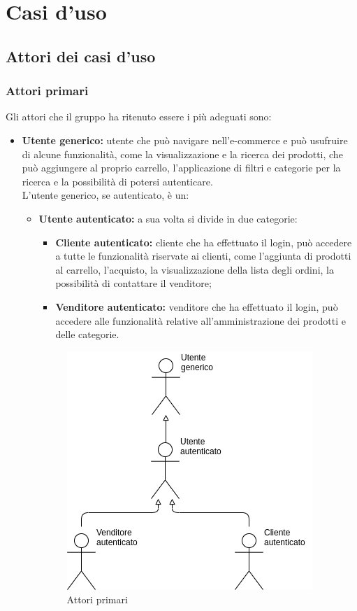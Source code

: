 \section{Casi d'uso}
\subsection{Attori dei casi d'uso}
\subsubsection{Attori primari}
Gli attori che il gruppo ha ritenuto essere i più adeguati sono:
\begin{itemize}
    \item \textbf{Utente generico:} utente che può navigare nell'e-commerce e può usufruire di alcune funzionalità, come la visualizzazione e la ricerca dei prodotti, che può aggiungere al proprio carrello, l'applicazione di filtri e categorie per la ricerca e la possibilità di potersi autenticare.\\ L'utente generico, se autenticato, è un:
          \begin{itemize}
              \item \textbf{Utente autenticato:} a sua volta si divide in due categorie:
                    \begin{itemize}
                        \item \textbf{Cliente autenticato:} cliente che ha effettuato il login, può accedere a tutte le funzionalità riservate ai clienti, come l'aggiunta di prodotti al carrello, l'acquisto, la visualizzazione della lista degli ordini, la possibilità di contattare il venditore;
                        \item \textbf{Venditore autenticato:} venditore che ha effettuato il login, può accedere alle funzionalità relative all'amministrazione dei prodotti e delle categorie.
                    \end{itemize}
                    \begin{figure}[!ht]
                        \caption{Attori primari}
                        \vspace{5px}
                        \includegraphics[scale=0.6]{../../../Images/AnalisiRequisiti/attori}
                        \centering
                    \end{figure}
          \end{itemize}
\end{itemize}
